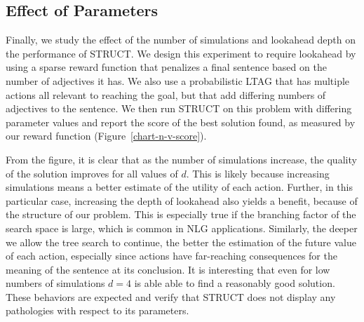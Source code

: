 \subsection{Effect of Parameters}
Finally, we study the effect of the number of simulations and
lookahead depth on the performance of STRUCT. We design this
experiment to require lookahead by using  a sparse
reward function that penalizes a final sentence based on the number of
adjectives it has. We also use a probabilistic LTAG that has multiple
actions all relevant to reaching the goal, but that add differing
numbers of adjectives to the sentence. We then run STRUCT on this
problem with differing parameter values and report the score of the
best solution found, as measured by our reward function
(Figure~\ref{chart-n-v-score}). 

From the figure, it is clear that as the number of simulations
increase, the quality of the solution improves for all values of $d$.
This is likely because increasing simulations means a better estimate
of the utility of each action. Further, in this particular case,
increasing the depth of lookahead also yields a benefit, because of
the structure of our problem. This is especially true if the branching
factor of the search space is large, which is common in NLG
applications.  Similarly, the deeper we allow the tree search to continue, the
better the estimation of the future value of each action,
especially since actions have far-reaching consequences for the
meaning of the sentence at its conclusion. 
It is interesting that even for low numbers of
simulations $d=4$ is able able to find a reasonably good
solution. These behaviors are expected and verify 
that STRUCT does not display any pathologies with respect to its parameters.
